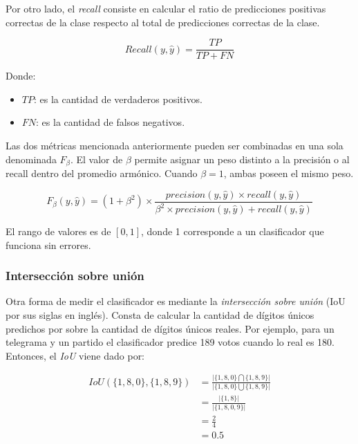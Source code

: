 Por otro lado, el {\it recall} consiste en calcular el ratio de predicciones positivas correctas de la clase respecto
al total de predicciones correctas de la clase.

\begin{equation}
    Recall(y, \hat{y}) = \frac{TP}{TP + FN}
\end{equation}

Donde:
\begin{itemize}
    \item $TP$: es la cantidad de verdaderos positivos.
    \item $FN$: es la cantidad de falsos negativos.
\end{itemize}

Las dos m\'etricas mencionada anteriormente pueden ser combinadas en una sola denominada $F_{\beta}$. El valor de
$\beta$ permite asignar un peso distinto a la precisi\'on o al recall dentro del promedio arm\'onico. Cuando $\beta=1$,
ambas poseen el mismo peso.

\begin{equation}
    F_{\beta}(y, \hat{y}) = (1 + \beta^2) \times \frac{precision(y, \hat{y}) \times recall(y, \hat{y})}{\beta^2 \times precision(y, \hat{y}) + recall(y, \hat{y})}
\end{equation}

El rango de valores es de $[0, 1]$, donde 1 corresponde a un clasificador que funciona sin errores.

\subsubsection{Intersecci\'on sobre uni\'on}

Otra forma de medir el clasificador es mediante la {\it intersecci\'on sobre uni\'on} (IoU por sus siglas en ingl\'es).
Consta de calcular la cantidad de d\'igitos \'unicos predichos por sobre la cantidad de d\'igitos \'unicos reales. Por
ejemplo, para un telegrama y un partido el clasificador predice 189 votos cuando lo real es 180. Entonces, el {\it IoU}
viene dado por:

\begin{align}
    IoU(\{1, 8, 0\}, \{1, 8, 9\}) & = \frac{\lvert\{1, 8, 0\} \bigcap \{1, 8, 9\}\rvert}{\lvert\{1, 8, 0\} \bigcup \{1, 8, 9\}\rvert} \nonumber \\
                                  & = \frac{\lvert\{1, 8\}\rvert}{\lvert\{1, 8, 0, 9\}\rvert}                                         \nonumber \\
                                  & = \frac{2}{4}                                                                     \nonumber                 \\
                                  & = 0.5
\end{align}


